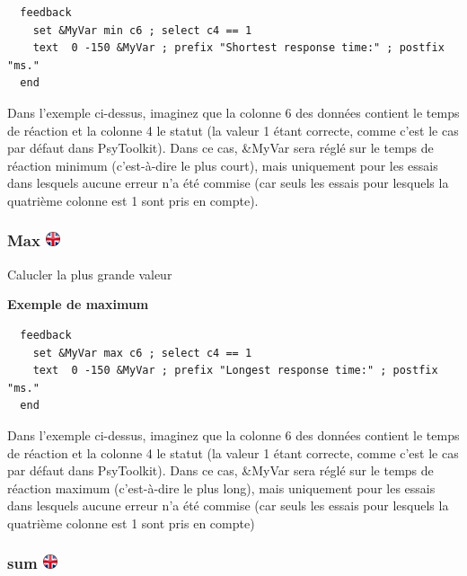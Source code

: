 \documentclass[
]{book}
\begin{document}
\begin{verbatim}
  feedback
    set &MyVar min c6 ; select c4 == 1
    text  0 -150 &MyVar ; prefix "Shortest response time:" ; postfix "ms."
  end
\end{verbatim}

Dans l'exemple ci-dessus, imaginez que la colonne 6 des données contient
le temps de réaction et la colonne 4 le statut (la valeur 1 étant
correcte, comme c'est le cas par défaut dans PsyToolkit). Dans ce cas,
\&MyVar sera réglé sur le temps de réaction minimum (c'est-à-dire le
plus court), mais uniquement pour les essais dans lesquels aucune erreur
n'a été commise (car seuls les essais pour lesquels la quatrième colonne
est 1 sont pris en compte).

\hypertarget{max}{%
\subsubsection[Max ]{\texorpdfstring{Max
\href{https://www.psytoolkit.org/doc3.1.0/feedback.html\#_max}{\protect\includegraphics{img/ukflag.png}}}{Max }}\label{max}}

Calucler la plus grande valeur

\textbf{Exemple de maximum}

\begin{verbatim}
  feedback
    set &MyVar max c6 ; select c4 == 1
    text  0 -150 &MyVar ; prefix "Longest response time:" ; postfix "ms."
  end
\end{verbatim}

Dans l'exemple ci-dessus, imaginez que la colonne 6 des données contient
le temps de réaction et la colonne 4 le statut (la valeur 1 étant
correcte, comme c'est le cas par défaut dans PsyToolkit). Dans ce cas,
\&MyVar sera réglé sur le temps de réaction maximum (c'est-à-dire le
plus long), mais uniquement pour les essais dans lesquels aucune erreur
n'a été commise (car seuls les essais pour lesquels la quatrième colonne
est 1 sont pris en compte)

\hypertarget{sum}{%
\subsubsection[sum ]{\texorpdfstring{sum
\href{https://www.psytoolkit.org/doc3.1.0/feedback.html\#_sum}{\protect\includegraphics{img/ukflag.png}}}{sum }}\label{sum}}
\end{document}
